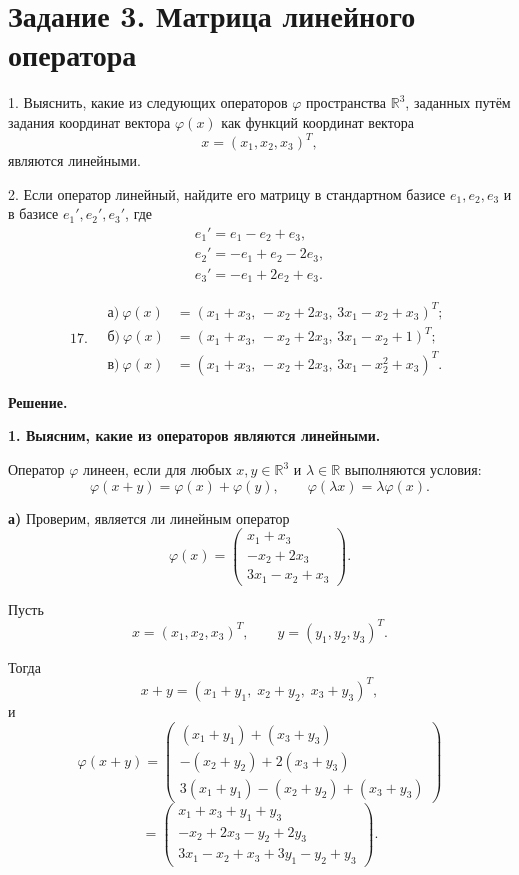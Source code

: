 \section{Задание 3. Матрица линейного оператора}

1. Выяснить, какие из следующих операторов $\varphi$ пространства $\mathbb{R}^3$, заданных путём задания координат вектора $\varphi(x)$ как функций координат вектора
\[
x=(x_1,x_2,x_3)^T,
\]
являются линейными.

2. Если оператор линейный, найдите его матрицу в стандартном базисе $e_1,e_2,e_3$ и в базисе $e_1',e_2',e_3'$, где
\[
\begin{gathered}
e_1' = e_1 - e_2 + e_3,\\
e_2' = -e_1 + e_2 - 2e_3,\\
e_3' = -e_1 + 2e_2 + e_3.
\end{gathered}
\]

\[
17.\quad
\begin{aligned}
\text{а)}\ \varphi(x) &= (x_1 + x_3,\,-x_2 + 2x_3,\,3x_1 - x_2 + x_3)^T;\\
\text{б)}\ \varphi(x) &= (x_1 + x_3,\,-x_2 + 2x_3,\,3x_1 - x_2 + 1)^T;\\
\text{в)}\ \varphi(x) &= (x_1 + x_3,\,-x_2 + 2x_3,\,3x_1 - x_2^2 + x_3)^T.
\end{aligned}
\]

\textbf{Решение.}

\textbf{1. Выясним, какие из операторов являются линейными.}

Оператор $\varphi$ линеен, если для любых $x,y\in\mathbb{R}^3$ и $\lambda\in\mathbb{R}$ выполняются условия:
\[
\varphi(x+y)=\varphi(x)+\varphi(y),
\qquad
\varphi(\lambda x)=\lambda \varphi(x).
\]

\textbf{а)} Проверим, является ли линейным оператор
\[
\varphi(x)=
\begin{pmatrix}
x_1+x_3\\
-x_2+2x_3\\
3x_1-x_2+x_3
\end{pmatrix}.
\]

Пусть
\[
x=(x_1,x_2,x_3)^T,\qquad y=(y_1,y_2,y_3)^T.
\]

Тогда
\[
x+y=(x_1+y_1,\;x_2+y_2,\;x_3+y_3)^T,
\]
и
\[
\varphi(x+y)=
\begin{pmatrix}
(x_1+y_1)+(x_3+y_3)\\
-(x_2+y_2)+2(x_3+y_3)\\
3(x_1+y_1)-(x_2+y_2)+(x_3+y_3)
\end{pmatrix}
\]
\[
=
\begin{pmatrix}
x_1+x_3+y_1+y_3\\
-x_2+2x_3-y_2+2y_3\\
3x_1-x_2+x_3+3y_1-y_2+y_3
\end{pmatrix}.
\]

